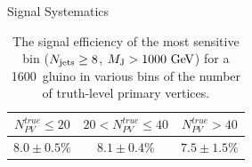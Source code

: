 \begin{section}{Signal Systematics}
\begin{table}[tbp!]
\centering
\begin{tabular}{ |c|c|c| }
\hline
$N_{PV}^{true} \leq 20$ & $20 < N_{PV}^{true} \leq 40$ & $N_{PV}^{true} > 40$ \\ \hline
$8.0 \pm 0.5\%$ & $8.1 \pm 0.4\%$ & $7.5 \pm 1.5\%$ \\ \hline
\end{tabular}
\caption{The signal efficiency of the most sensitive bin ($N_{\mathrm{jets}} \geq 8$, $M_{\mathrm{J}} > 1000~\mathrm{Ge\kern -0.1em V}$) for a 1600~\GeV gluino in various bins of the number of truth-level primary vertices.}
\label{tab:sig_pu_dependence}
\end{table}

\end{section}

